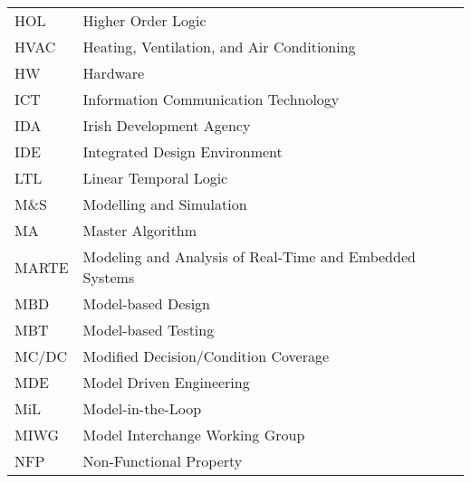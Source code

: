 \begin{longtable}{ll}
HOL & Higher Order Logic\\
HVAC    &Heating, Ventilation, and Air Conditioning\\
HW      &Hardware\\
ICT	&Information Communication Technology\\
IDA & Irish Development Agency \\
IDE	&Integrated Design Environment\\
LTL & Linear Temporal Logic \\
M\&S    &Modelling and Simulation\\
MA & Master Algorithm \\
MARTE & Modeling and Analysis of Real-Time and Embedded Systems\\
MBD     &Model-based Design\\
MBT & Model-based Testing\\
MC/DC   &Modified Decision/Condition Coverage\\
MDE & Model Driven Engineering \\
MiL 	&Model-in-the-Loop\\
MIWG & Model Interchange Working Group\\
NFP & Non-Functional Property \\

\end{longtable}
